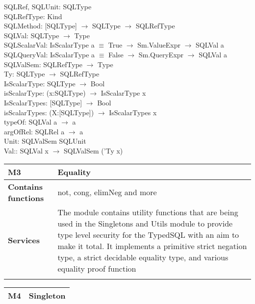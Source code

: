\documentclass[12pt, svgnames]{article}
\begin{document}
{{ SQLRef, SQLUnit: SQLType \\
 SQLRefType: Kind\\
 
 SQLMethod: [SQLType] $\rightarrow$ SQLType $\rightarrow$ SQLRefType \\
 SQLVal: SQLType $\rightarrow$ Type \\
 
 SQLScalarVal: IsScalarType a $\equiv$ True $\rightarrow$ Sm.ValueExpr 
 $\rightarrow$ SQLVal a \\
 SQLQueryVal: IsScalarType a $\equiv$ False $\rightarrow$ Sm.QueryExpr 
 $\rightarrow$ SQLVal a \\
 
 SQLValSem: SQLRefType $\rightarrow$ Type\\

 
 Ty: SQLType $\rightarrow$ SQLRefType \\

 IsScalarType: SQLType $\rightarrow$ Bool \\
 isScalarType: (x:SQLType) $\rightarrow$ IsScalarType x \\
 IsScalarTypes: [SQLType] $\rightarrow$ Bool \\
 isScalarTypes: (X:[SQLType]) $\rightarrow$ IsScalarTypes x \\
 
 typeOf: SQLVal a $\rightarrow$ a \\
 argOfRel: SQLRel a $\rightarrow$ a\\
 
 Unit: SQLValSem SQLUnit\\
 Val:: SQLVal x $\rightarrow$ SQLValSem ('Ty x)
 
 

{\setlength{\tabcolsep}{6pt} 
    \begin{tabularx}{\textwidth}{>{\bfseries}m{4cm}X}
        M3 & Equality \\ 
        \midrule
        
        Contains functions  &  not, cong, elimNeg and more
        \\	Services &  The module contains utility functions that are being used in the Singletons and Utils module to provide type 		level security for the TypedSQL with an aim to make it total. It implements a primitive strict negation type, a strict decidable equality type,  and various equality proof function
        \\       
        \vspace{12pt}
    \end{tabularx}
    \vspace{3em}
{\setlength{\tabcolsep}{6pt} 
    \begin{tabularx}{\textwidth}{>{\bfseries}m{4cm}X}
        M4 & Singleton \\ 
        \midrule
        

\end{tabularx}}}}}
\end{document}
